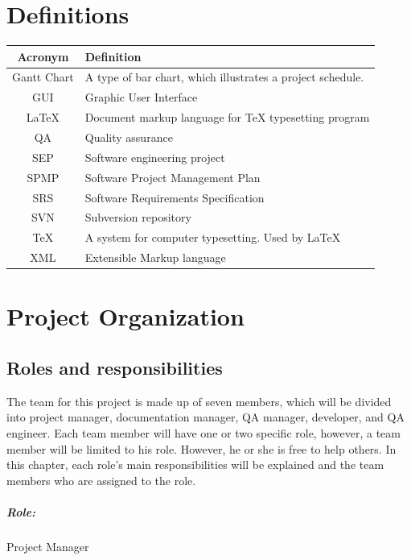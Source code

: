\documentclass[11pt, a4paper]{report}
\begin{document}
\pagebreak


\chapter{Definitions}
\begin{tabular}{|c|p{10cm}|}%
\hline
Acronym      		&	Definition       											\\ \hline
Gantt Chart      	& 	A type of bar chart, which illustrates a project schedule.	\\ \hline
GUI					& 	Graphic User Interface 										\\ \hline
{\LaTeX}			&	Document markup language for {\TeX} typesetting program 	\\ \hline
QA 					&	Quality assurance 											\\ \hline
SEP					&	Software engineering project								\\ \hline
SPMP				&	Software Project Management Plan							\\ \hline
SRS					&	Software Requirements Specification							\\ \hline
SVN					&	Subversion repository										\\ \hline
{\TeX} 				&	A system for computer typesetting. Used by {\LaTeX}			\\ \hline
XML					& 	Extensible Markup language 									\\ \hline
\end{tabular}

\pagebreak


\chapter{Project Organization}

\section{Roles and responsibilities}
The team for this project is made up of seven members, which will be divided into project manager, documentation manager, QA manager, developer, and QA engineer. Each team member will have one or two specific role, however, a team member will be limited to his role. However, he or she is free to help others. In this chapter, each role's main responsibilities will be explained and the team members who are assigned to the role.

\paragraph{Role: } Project Manager
\end{document}
